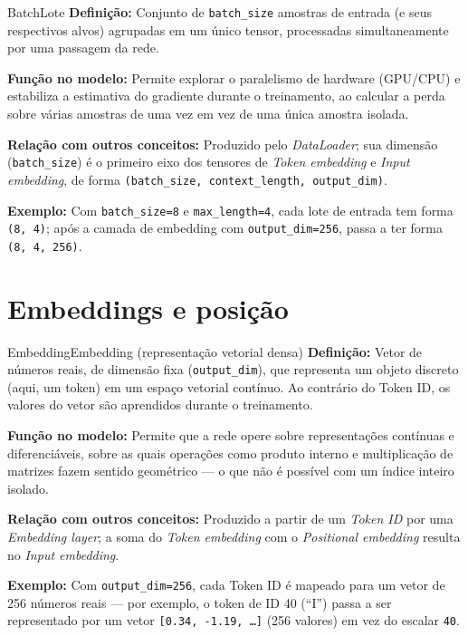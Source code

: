\documentclass[11pt,a4paper]{article}
\newcommand{\campo}[2]{\textbf{\textcolor{accentblue}{#1:}} #2\par\smallskip}
\begin{document}
\begin{termo}{Batch}{Lote}
\campo{Definição}{Conjunto de \texttt{batch\_size} amostras de entrada (e seus
respectivos alvos) agrupadas em um único tensor, processadas simultaneamente por uma
passagem da rede.}
\campo{Função no modelo}{Permite explorar o paralelismo de hardware (GPU/CPU) e
estabiliza a estimativa do gradiente durante o treinamento, ao calcular a perda sobre
várias amostras de uma vez em vez de uma única amostra isolada.}
\campo{Relação com outros conceitos}{Produzido pelo \emph{DataLoader}; sua
dimensão (\texttt{batch\_size}) é o primeiro eixo dos tensores de
\emph{Token embedding} e \emph{Input embedding}, de forma
\texttt{(batch\_size, context\_length, output\_dim)}.}
\campo{Exemplo}{Com \texttt{batch\_size=8} e \texttt{max\_length=4}, cada lote de
entrada tem forma \texttt{(8, 4)}; após a camada de embedding com
\texttt{output\_dim=256}, passa a ter forma \texttt{(8, 4, 256)}.}
\end{termo}

\clearpage
\section{Embeddings e posição}

\begin{termo}{Embedding}{Embedding (representação vetorial densa)}
\campo{Definição}{Vetor de números reais, de dimensão fixa (\texttt{output\_dim}), que
representa um objeto discreto (aqui, um token) em um espaço vetorial contínuo. Ao
contrário do Token ID, os valores do vetor são aprendidos durante o treinamento.}
\campo{Função no modelo}{Permite que a rede opere sobre representações contínuas e
diferenciáveis, sobre as quais operações como produto interno e multiplicação de
matrizes fazem sentido geométrico --- o que não é possível com um índice inteiro
isolado.}
\campo{Relação com outros conceitos}{Produzido a partir de um \emph{Token ID} por
uma \emph{Embedding layer}; a soma do \emph{Token embedding} com o
\emph{Positional embedding} resulta no \emph{Input embedding}.}
\campo{Exemplo}{Com \texttt{output\_dim=256}, cada Token ID é mapeado para um vetor de
256 números reais --- por exemplo, o token de ID 40 (``I'') passa a ser representado
por um vetor \texttt{[0.34, -1.19, \ldots]} (256 valores) em vez do escalar
\texttt{40}.}
\end{termo}
\end{document}
